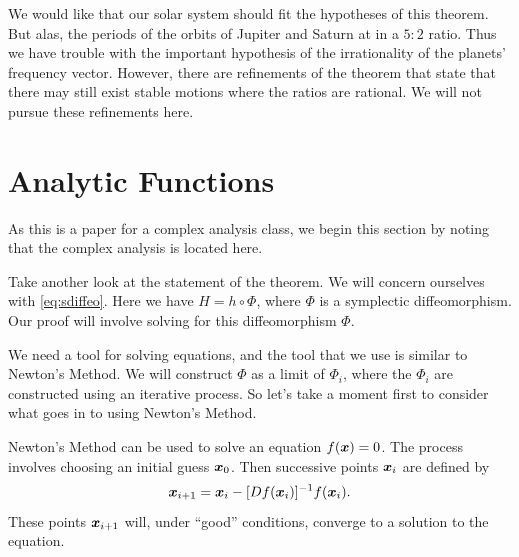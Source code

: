 \documentclass[twoside,letterpaper,11pt]{article}
\numberwithin{equation}{section}
\begin{document}
We would like that our solar system should fit the hypotheses of this theorem.
But alas, the periods of the orbits of Jupiter and Saturn at in a $5 : 2$ ratio.
Thus we have trouble with the important hypothesis of the irrationality of the
planets' frequency vector.
However, there are refinements of the theorem that state that there may still
exist stable motions where the ratios are rational.
We will not pursue these refinements here.

\section{Analytic Functions}
\label{sec:analytic-functions}

As this is a paper for a complex analysis class, we begin this section by noting
that the complex analysis is located here.

Take another look at the statement of the theorem.
We will concern ourselves with \cref{eq:sdiffeo}.
Here we have $H = h \circ \Phi$, where $\Phi$ is a symplectic diffeomorphism.
Our proof will involve solving for this diffeomorphism $\Phi$.

We need a tool for solving equations, and the tool that we use is similar to
Newton's Method.
We will construct $\Phi$ as a limit of $\Phi_i$, where the $\Phi_i$ are
constructed using an iterative process.
So let's take a moment first to consider what goes in to using Newton's Method.

Newton's Method can be used to solve an equation $f(\bm{x}) = 0$.
The process involves choosing an initial guess $\bm{x}_0$.
Then successive points $\bm{x}_i$ are defined by
\begin{equation*}
  \bm{x}_{i+1} = \bm{x}_i - [Df(\bm{x}_i)]^{-1} f(\bm{x}_i).
\end{equation*}
These points $\bm{x}_{i+1}$ will, under ``good'' conditions, converge to a
solution to the equation.
\end{document}
